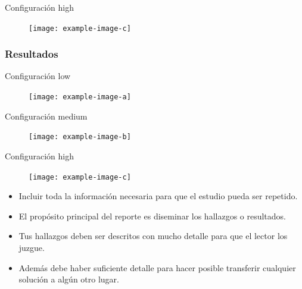 Configuración high
\begin{figure}[H]
    \centering
    \texttt{[image: example-image-c]}
\end{figure}



\subsubsection{Resultados}

Configuración low
\begin{figure}[H]
    \centering
    \texttt{[image: example-image-a]}
\end{figure}


Configuración medium
\begin{figure}[H]
    \centering
    \texttt{[image: example-image-b]}
\end{figure}

Configuración high
\begin{figure}[H]
    \centering
    \texttt{[image: example-image-c]}
\end{figure}

\begin{itemize}

    \item Incluir toda la información necesaria para que el estudio
    pueda ser repetido.
    \item El propósito principal del reporte es diseminar los hallazgos o resultados.
    \item Tus hallazgos deben ser descritos con mucho detalle para que el lector los juzgue.
    \item Además debe haber suficiente detalle para hacer posible
    transferir cualquier solución a algún otro lugar.
\end{itemize}    



